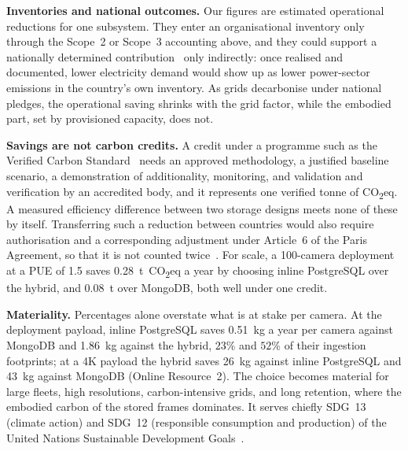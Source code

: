\documentclass[pdflatex,sn-basic]{sn-jnl}%
\begin{document}
{\color{markup}\textbf{Inventories and national outcomes.} Our figures are estimated operational reductions for one subsystem.} {\color{markup}They enter an organisational inventory only through the Scope~2 or Scope~3 accounting above, and they could support a nationally determined contribution~\citep{unfccc_paris_agreement} only indirectly: once realised and documented, lower electricity demand would show up as lower power-sector emissions in the country's own inventory.} {\color{markup}As grids decarbonise under national pledges, the operational saving shrinks with the grid factor, while the embodied part, set by provisioned capacity, does not.}

{\color{markup}\textbf{Savings are not carbon credits.} A credit under a programme such as the Verified Carbon Standard~\citep{verra_vcs_standard} needs an approved methodology, a justified baseline scenario, a demonstration of additionality, monitoring, and validation and verification by an accredited body, and it represents one verified tonne of CO\textsubscript{2}eq.} {\color{markup}A measured efficiency difference between two storage designs meets none of these by itself.} {\color{markup}Transferring such a reduction between countries would also require authorisation and a corresponding adjustment under Article~6 of the Paris Agreement, so that it is not counted twice~\citep{unfccc_paris_agreement,unfccc_decision_2cma3}.} {\color{markup}For scale, a 100-camera deployment at a PUE of 1.5 saves 0.28~t~CO\textsubscript{2}eq a year by choosing inline PostgreSQL over the hybrid, and 0.08~t over MongoDB, both well under one credit.}

{\color{markup}\textbf{Materiality.} Percentages alone overstate what is at stake per camera.} {\color{markup}At the deployment payload, inline PostgreSQL saves 0.51~kg a year per camera against MongoDB and 1.86~kg against the hybrid, $23\%$ and $52\%$ of their ingestion footprints; at a 4K payload the hybrid saves 26~kg against inline PostgreSQL and 43~kg against MongoDB (Online Resource~2).} {\color{markup}The choice becomes material for large fleets, high resolutions, carbon-intensive grids, and long retention, where the embodied carbon of the stored frames dominates.} {\color{markup}It serves chiefly SDG~13 (climate action) and SDG~12 (responsible consumption and production) of the United Nations Sustainable Development Goals~\citep{un_sdg}.}
\end{document}
